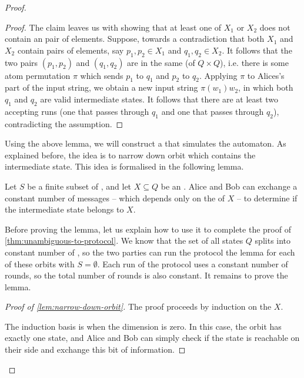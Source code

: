 \begin{proof}
\begin{proof}
The claim leaves us with showing that at least one of $X_1$ or $X_2$ does not
contain an  pair of elements. Suppose, towards a contradiction that
both $X_1$ and $X_2$ contain  pairs of elements, say $p_1, p_2 \in
X_1$ and $q_1, q_2 \in X_2$. It follows that the two pairs $(p_1,p_2)$ and
$(q_1,q_2)$ are in the same  (of $Q \times Q$), i.e. there is
some atom permutation $\pi$ which sends $p_1$ to $q_1$ and $p_2$ to $q_2$.
Applying $\pi$ to Alices's part of the input string, we obtain a new input
string $\pi(w_1) w_2$, in which both $q_1$ and $q_2$ are valid intermediate
states. It follows that there are at least two accepting runs (one that passes
through $q_1$ and one that passes through $q_2$), contradicting the 
assumption. 
\end{proof}

Using the above lemma, we will construct a  that
simulates the automaton. As explained before, the idea is to narrow down orbit
which contains the intermediate state. This idea is formalised in the following
lemma. 


\begin{lemma}\label{lem:narrow-down-orbit}
  Let $S$ be a finite subset of , and let $X \subseteq Q$ be an . 
  Alice and Bob can exchange a constant number of messages
  -- which depends only on the  of $X$ -- 
  to determine if the intermediate state belongs to $X$. 
\end{lemma}

Before proving the lemma, let us explain how to use it to complete the proof of
\cref{thm:unambiguous-to-protocol}. We know that the set of all states $Q$
splits into constant number of , so the two parties can run
the protocol the lemma for each of these orbits with $S=\emptyset$. Each run of
the protocol uses a constant number of rounds, so the total number of rounds is
also constant. It remains to prove the lemma.

\begin{proof}[Proof of \cref{lem:narrow-down-orbit}]
  The proof proceeds by induction on the  $X$.
    
  The induction basis is when the dimension is zero. In this case, the orbit
  has exactly one state, and Alice and Bob can simply check  if the state is
  reachable on their side and exchange this bit of information.


\end{proof}
\end{proof}
